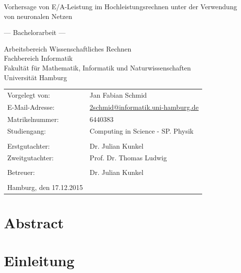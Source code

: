 \documentclass[
	12pt,
	a4paper,
	BCOR10mm,
	DIV14,
	listof=totoc,
	bibliography=totoc,
	headsepline
]{scrreprt}
\begin{document}
\begin{titlepage}
	\begin{center}
		{\titlefont\huge Vorhersage von E/A-Leistung im Hochleistungsrechnen unter der Verwendung von neuronalen Netzen\par}

		\bigskip
		\bigskip

		{\titlefont\Large --- Bachelorarbeit ---\par}

		\bigskip
		\bigskip

		{\large Arbeitsbereich Wissenschaftliches Rechnen\\
		Fachbereich Informatik\\
		Fakultät für Mathematik, Informatik und Naturwissenschaften\\
		Universität Hamburg\par}
	\end{center}

	\vfill

	{\large \begin{tabular}{ll}
		Vorgelegt von: & Jan Fabian Schmid \\
		E-Mail-Adresse: & \href{mailto:2schmid@informatik.uni-hamburg.de}{2schmid@informatik.uni-hamburg.de} \\
		Matrikelnummer: & 6440383 \\
		Studiengang: & Computing in Science - SP. Physik \\
		\\
		Erstgutachter: & Dr. Julian Kunkel \\
		Zweitgutachter: & Prof. Dr. Thomas Ludwig\\ \\
		Betreuer: & Dr. Julian Kunkel \\
		\\
		Hamburg, den 17.12.2015
	\end{tabular}\par}
\end{titlepage}

\chapter*{Abstract}

\thispagestyle{empty}



\tableofcontents

\chapter{Einleitung}
\label{Einleitung}
\end{document}
